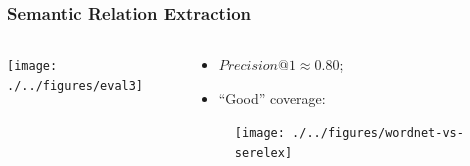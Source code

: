 \begin{frame}
\frametitle{Semantic Relation Extraction}
  \begin{columns}[T]
    \begin{column}{.4\textwidth}
     
\texttt{[image: ./../figures/eval3]}
    
    \end{column}
    \begin{column}{.6\textwidth}
\begin{itemize}
  \item $Precision@1 \approx 0.80$;
  \item ``Good'' coverage:
  
\end{itemize}

\begin{figure}
\texttt{[image: ./../figures/wordnet-vs-serelex]}
\end{figure}
      
    \end{column}
  \end{columns}
\end{frame}






